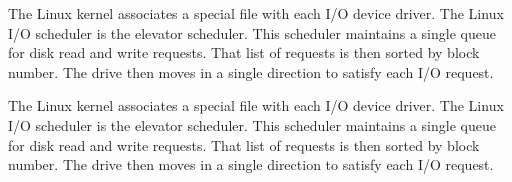 \documentclass[letterpaper,10pt,draftclsnofoot,onecolumn]{IEEEtran}
\begin{document}
The Linux kernel associates a special file with each I/O device driver. 
The Linux I/O scheduler is the elevator scheduler. This scheduler maintains a single queue for disk read and
write requests. That list of requests is then sorted by block number. The drive then moves in a single direction to satisfy each I/O request. 



The Linux kernel associates a special file with each I/O device driver. 
The Linux I/O scheduler is the elevator scheduler. This scheduler maintains a single queue for disk read and
write requests. That list of requests is then sorted by block number. The drive then moves in a single direction to satisfy each I/O request. 











%
\end{document}
